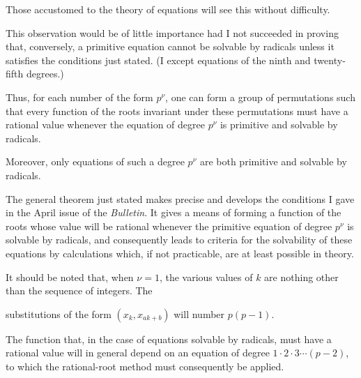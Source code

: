 Those accustomed to the theory of equations will see this without
difficulty.

This observation would be of little importance had I not succeeded in
proving that, conversely, a primitive equation cannot be solvable by
radicals unless it satisfies the conditions just stated. (I except
equations of the ninth and twenty-fifth degrees.)


Thus, for each number of the form $p^\nu$, one can form a group of
permutations such that every function of the roots invariant under these
permutations must have a rational value whenever the equation of degree
$p^\nu$ is primitive and solvable by radicals.

Moreover, only equations of such a degree $p^\nu$ are both primitive
and solvable by radicals.

The general theorem just stated makes precise and develops the
conditions I gave in the April issue of the \emph{Bulletin}. It gives a
means of forming a function of the roots whose value will be rational
whenever the primitive equation of degree $p^\nu$ is solvable by
radicals, and consequently leads to criteria for the solvability of
these equations by calculations which, if not practicable, are at least
possible in theory.

It should be noted that, when $\nu=1$, the various values of $k$ are
nothing other than the sequence of integers. The


substitutions of the form $(x_k,x_{ak+b})$ will number $p(p-1)$.

The function that, in the case of equations solvable by radicals, must
have a rational value will in general depend on an equation of degree
$1\mathbin{\cdot}2\mathbin{\cdot}3\cdots(p-2)$, to which the rational-root
method must consequently be applied.


